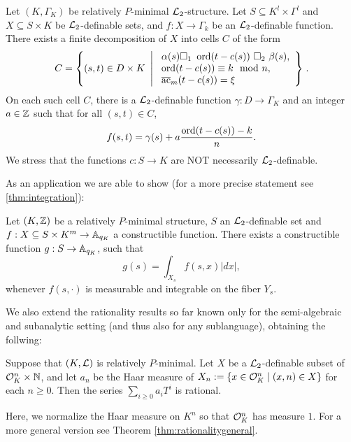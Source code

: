 \begin{thm}\label{thm:partialprep} 
Let $(K,\Gamma_K)$ be relatively $P$-minimal $\Lm_2$-structure. Let $S\subseteq K^l\times\Gamma^l$ and $X \subseteq S \times K$ be $\Lm_2$-definable sets, and $f:X\rightarrow \Gamma_k$ be an $\Lm_2$-definable function. There exists a finite decomposition of $X$ into cells $C$ of the form  
\[C = \left\{(s,t) \in D\times K \ \left| \ \begin{array}{l} \alpha(s) \square_1 \ \ord(t-c(s)) \ \square_2 \ \beta(s),\\ \ord(t-c(s)) \equiv k\mod n,\\ \ac_{m}(t-c(s)) = \xi \end{array} \right\}\right..\]
On each such cell $C$, there is a $\Lm_2$-definable function $\gamma:D\to\Gamma_K$ and an integer $a\in \ZZ$ such that for all $(s,t) \in C$, 
\[f(s,t) = \gamma(s) + a\frac{\ord(t-c(s))-k}{n}.\]
We stress that the functions $c: S\to K$ are NOT necessarily $\Lm_2$-definable.
\end{thm}

As an application we are able to show (for a more precise statement see \ref{thm:integration}): 

\begin{thm*}
Let $(K, \Z)$ be a relatively $P$-minimal structure, $S$ an $\Lm_2$-definable set and $f: X \subseteq S\times K^m \to \AA_{q_K}$ a constructible function.  There exists a constructible function $g: S \to \AA_{q_K}$, such that
\[g(s) = \int_{X_s} f(s,x)|dx|,\]
whenever $f(s, \cdot)$ is measurable and integrable on the fiber $Y_s$.
\end{thm*}

We also extend the rationality results so far known only for the semi-algebraic \cite{denef-84} and subanalytic setting \cite{denef-vdd-88} (and thus also for any sublanguage), obtaining the follwing:

\begin{thm}\label{thm:rationality}
Suppose that $(K,\cL)$ is relatively $P$-minimal. Let $X$ be a $\cL_2$-definable subset of $\cO_K^n\times \NN$, and let $a_n$ be the Haar measure of $X_n:=\{x\in \cO_K^n\mid (x,n)\in X\}$ for each $n\geq 0$. Then the series $\sum_{i\geq 0} a_i T^i$ is rational. 
\end{thm}
Here, we normalize the Haar measure on $K^n$ so that $\cO_K^n$ has measure $1$. For a more general version see Theorem \ref{thm:rationalitygeneral}.  

\

